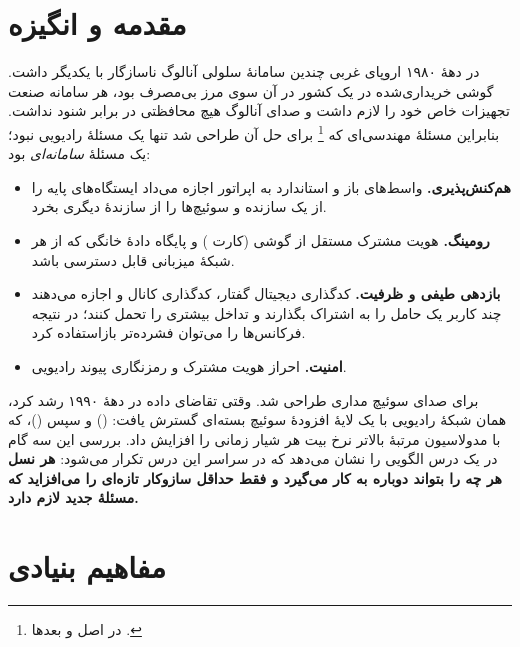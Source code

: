 \documentclass[11pt,a4paper]{article}
\begin{document}
\section{مقدمه و انگیزه}\label{sec:intro}
در دههٔ ۱۹۸۰ اروپای غربی چندین سامانهٔ سلولی آنالوگ ناسازگار با یکدیگر داشت. گوشی
خریداری‌شده در یک کشور در آن سوی مرز بی‌مصرف بود، هر سامانه صنعت تجهیزات خاص خود را
لازم داشت و صدای  آنالوگ هیچ محافظتی در برابر شنود نداشت. بنابراین مسئلهٔ مهندسی‌ای
که \footnote{در اصل  و بعدها
.} برای حل آن طراحی شد تنها یک مسئلهٔ
رادیویی نبود؛ یک مسئلهٔ \emph{سامانه‌ای} بود:
\begin{itemize}
  \item \textbf{هم‌کنش‌پذیری.} واسط‌های باز و استاندارد به اپراتور اجازه می‌داد ایستگاه‌های
        پایه را از یک سازنده و سوئیچ‌ها را از سازندهٔ دیگری بخرد.
  \item \textbf{رومینگ.} هویت مشترک مستقل از گوشی (کارت ) و پایگاه دادهٔ خانگی
        که از هر شبکهٔ میزبانی قابل دسترسی باشد.
  \item \textbf{بازدهی طیفی و ظرفیت.} کدگذاری دیجیتال گفتار، کدگذاری کانال و 
        اجازه می‌دهند چند کاربر یک حامل را به اشتراک بگذارند و تداخل بیشتری را تحمل کنند؛
        در نتیجه فرکانس‌ها را می‌توان فشرده‌تر بازاستفاده کرد.
  \item \textbf{امنیت.} احراز هویت مشترک و رمزنگاری پیوند رادیویی.
\end{itemize}
 برای صدای سوئیچ مداری طراحی شد. وقتی تقاضای داده در دههٔ ۱۹۹۰ رشد کرد، همان
شبکهٔ رادیویی با یک لایهٔ افزودهٔ سوئیچ بسته‌ای گسترش یافت: 
() و سپس 
()، که با مدولاسیون مرتبهٔ بالاتر نرخ بیت هر
شیار زمانی را افزایش داد. بررسی این سه گام در یک درس الگویی را نشان می‌دهد که در سراسر
این درس تکرار می‌شود: \textbf{هر نسل هر چه را بتواند دوباره به کار می‌گیرد و فقط
حداقل سازوکار تازه‌ای را می‌افزاید که مسئلهٔ جدید لازم دارد.}

\section{مفاهیم بنیادی}\label{sec:fundamentals}
\end{document}
